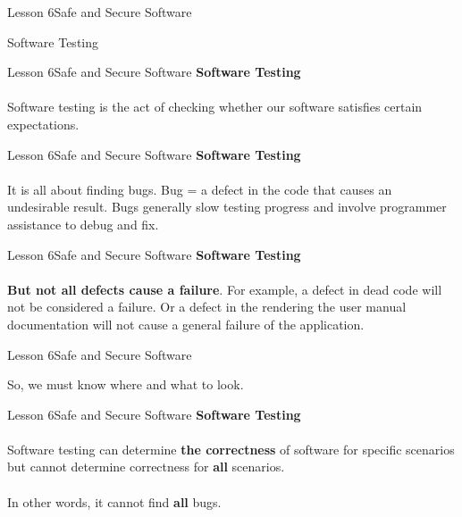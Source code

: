 \documentclass[aspectratio=1610]{beamer}
\begin{document}
\begin{frame}{Lesson 6}{Safe and Secure Software}
\Huge
\begin{center}
Software Testing
\end{center}
\end{frame}



\begin{frame}{Lesson 6}{Safe and Secure Software}
\LARGE
\textbf{Software Testing}\\~\\
Software testing is the act of checking whether our software satisfies certain 
expectations. 
\end{frame}

\begin{frame}{Lesson 6}{Safe and Secure Software}
\LARGE
\textbf{Software Testing}\\~\\
It is all about finding bugs. Bug = a defect in the code that causes an undesirable 
result. Bugs generally slow testing progress and involve programmer assistance to debug 
and fix.
\end{frame}

\begin{frame}{Lesson 6}{Safe and Secure Software}
\LARGE
\textbf{Software Testing}\\~\\
\textbf{But not all defects cause a failure}. For example, a defect in dead code will 
not be considered a failure. Or a defect in the rendering the user manual documentation 
will not cause a general failure of the application.
\end{frame}



\begin{frame}{Lesson 6}{Safe and Secure Software}
\Huge
\begin{center}
So, we must know where and what to look.
\end{center}
\end{frame}



\begin{frame}{Lesson 6}{Safe and Secure Software}
\LARGE
\textbf{Software Testing}\\~\\
Software testing can determine \textbf{the correctness} of software for specific 
scenarios but cannot determine correctness for \textbf{all} scenarios.\\~\\
In other words, it cannot find \textbf{all} bugs.
\end{frame}
\end{document}

